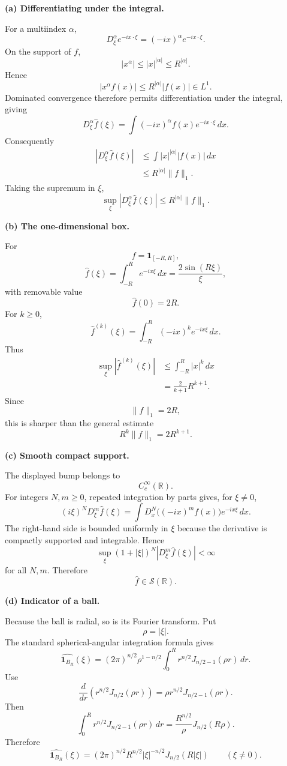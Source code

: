 \begin{solution}
\par\smallskip\noindent\textbf{(a) Differentiating under the integral.}

For a multiindex \(\alpha\),
\[
D_\xi^\alpha
e^{-ix\cdot\xi}
=
(-ix)^\alpha e^{-ix\cdot\xi}.
\]
On the support of \(f\),
\[
|x^\alpha|
\le
|x|^{|\alpha|}
\le
R^{|\alpha|}.
\]
Hence
\[
|x^\alpha f(x)|
\le
R^{|\alpha|}|f(x)|\in L^1.
\]
Dominated convergence therefore permits differentiation under the
integral, giving
\[
D_\xi^\alpha\widehat f(\xi)
=
\int
(-ix)^\alpha
f(x)e^{-ix\cdot\xi}\,dx.
\]
Consequently
\[
\begin{aligned}
|D_\xi^\alpha\widehat f(\xi)|
&\le
\int
|x|^{|\alpha|}|f(x)|\,dx\\
&\le
R^{|\alpha|}\|f\|_1.
\end{aligned}
\]
Taking the supremum in \(\xi\),
\[
\boxed{
\sup_\xi
|D_\xi^\alpha\widehat f(\xi)|
\le
R^{|\alpha|}\|f\|_1.}
\]

\par\smallskip\noindent\textbf{(b) The one-dimensional box.}

For
\[
f=\mathbf1_{[-R,R]},
\]
\[
\widehat f(\xi)
=
\int_{-R}^R e^{-ix\xi}\,dx
=
\frac{2\sin(R\xi)}{\xi},
\]
with removable value
\[
\widehat f(0)=2R.
\]
For \(k\ge0\),
\[
\widehat f^{(k)}(\xi)
=
\int_{-R}^R
(-ix)^ke^{-ix\xi}\,dx.
\]
Thus
\[
\begin{aligned}
\sup_\xi
|\widehat f^{(k)}(\xi)|
&\le
\int_{-R}^R|x|^k\,dx\\
&=
\boxed{
\frac{2}{k+1}R^{k+1}.}
\end{aligned}
\]
Since
\[
\|f\|_1=2R,
\]
this is sharper than the general estimate
\[
R^k\|f\|_1=2R^{k+1}.
\]

\par\smallskip\noindent\textbf{(c) Smooth compact support.}

The displayed bump belongs to
\[
C_c^\infty(\mathbb R).
\]
For integers \(N,m\ge0\), repeated integration by parts gives, for
\(\xi\ne0\),
\[
(i\xi)^N
D_\xi^m\widehat f(\xi)
=
\int
D_x^N\bigl((-ix)^m f(x)\bigr)
e^{-ix\xi}\,dx.
\]
The right-hand side is bounded uniformly in \(\xi\) because the
derivative is compactly supported and integrable. Hence
\[
\sup_\xi
(1+|\xi|)^N
|D_\xi^m\widehat f(\xi)|
<\infty
\]
for all \(N,m\). Therefore
\[
\boxed{\widehat f\in\mathcal S(\mathbb R).}
\]

\par\smallskip\noindent\textbf{(d) Indicator of a ball.}

Because the ball is radial, so is its Fourier transform. Put
\[
\rho=|\xi|.
\]
The standard spherical-angular integration formula gives
\[
\widehat{\mathbf1_{B_R}}(\xi)
=
(2\pi)^{n/2}
\rho^{1-n/2}
\int_0^R
r^{n/2}
J_{n/2-1}(\rho r)\,dr.
\]
Use
\[
\frac{d}{dr}
\left(
r^{n/2}
J_{n/2}(\rho r)
\right)
=
\rho
r^{n/2}
J_{n/2-1}(\rho r).
\]
Then
\[
\int_0^R
r^{n/2}
J_{n/2-1}(\rho r)\,dr
=
\frac{R^{n/2}}{\rho}
J_{n/2}(R\rho).
\]
Therefore
\[
\boxed{
\widehat{\mathbf1_{B_R}}(\xi)
=
(2\pi)^{n/2}
R^{n/2}
|\xi|^{-n/2}
J_{n/2}(R|\xi|)
\qquad(\xi\ne0).}
\]


\end{solution}
